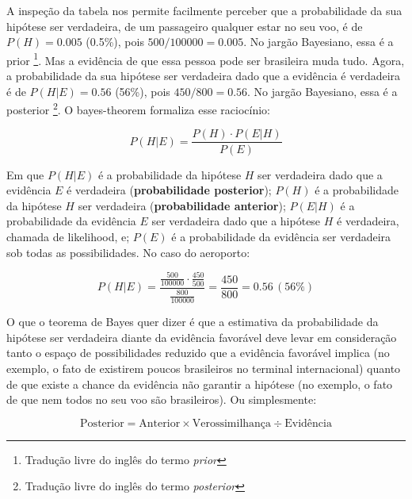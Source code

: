 \documentclass[./main.tex]{subfiles}
\begin{document}
A inspeção da tabela nos permite facilmente perceber que a probabilidade da sua hipótese ser verdadeira, de um passageiro qualquer estar no seu voo, é de $P(H) = 0.005$ (0.5\%), pois $500 / 100000 = 0.005$. No jargão Bayesiano, essa é a \gls{prior} \footnote{Tradução livre do inglês do termo \textit{prior}}. Mas a evidência de que essa pessoa pode ser brasileira muda tudo. Agora, a probabilidade da sua hipótese ser verdadeira dado que a evidência é verdadeira é de $P(H | E) = 0.56$ (56\%), pois $450 / 800 = 0.56$. No jargão Bayesiano, essa é a \gls{posterior} \footnote{Tradução livre do inglês do termo \textit{posterior}}. O \gls{bayes-theorem} formaliza esse raciocínio:
\begin{linenomath*}
\begin{equation}
\label{eq:bayes}
    P(H | E) = \frac{P(H) \cdot P(E | H)}{P(E)}
\end{equation}
\end{linenomath*}
Em que $P(H | E)$ é a probabilidade da hipótese $H$ ser verdadeira dado que a evidência $E$ é verdadeira (\textbf{probabilidade posterior}); $P(H)$ é a probabilidade da hipótese $H$ ser verdadeira (\textbf{probabilidade anterior});  $P(E | H)$ é a probabilidade da evidência $E$ ser verdadeira dado que a hipótese $H$ é verdadeira, chamada de \gls{likelihood}, e; $P(E)$ é a probabilidade da evidência ser verdadeira sob todas as possibilidades. No caso do aeroporto:
\begin{linenomath*}
\begin{equation*}
    P(H | E) = \frac{\frac{500}{100000} \cdot \frac{450}{500}}{\frac{800}{100000}} = \frac{450}{800} = 0.56\,(56\%)
\end{equation*}
\end{linenomath*}
O que o teorema de Bayes quer dizer é que a estimativa da probabilidade da hipótese ser verdadeira diante da evidência favorável deve levar em consideração tanto o espaço de possibilidades reduzido que a evidência favorável implica (no exemplo, o fato de existirem poucos brasileiros no terminal internacional) quanto de que existe a chance da evidência não garantir a hipótese (no exemplo, o fato de que nem todos no seu voo são brasileiros).  Ou simplesmente:
\begin{linenomath*}
\begin{equation*}
    \text{Posterior} = \text{Anterior} \times \text{Verossimilhança} \div \text{Evidência}
\end{equation*}
\end{linenomath*}
\end{document}
